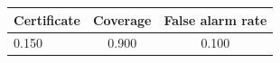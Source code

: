 \begin{tabular}{lcc}
\toprule
Certificate & Coverage & False alarm rate \\
\midrule
0.150 & 0.900 & 0.100 \\
\bottomrule
\end{tabular}
